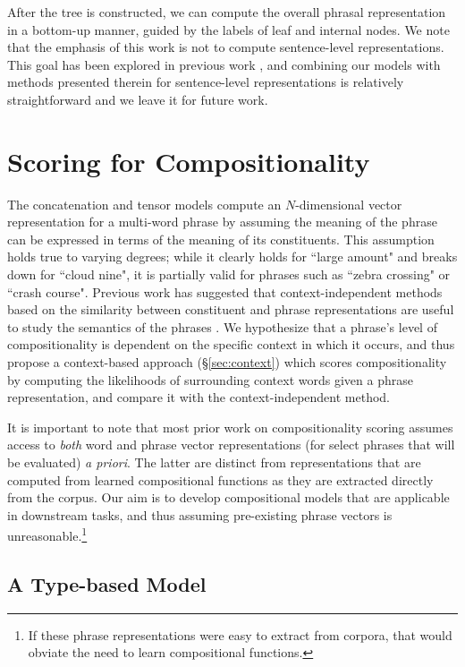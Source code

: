 \documentclass[11pt,letterpaper]{article}
\begin{document}
After the tree is constructed, we can compute the overall phrasal representation in a bottom-up manner, guided by the labels of leaf and internal nodes.
We note that the emphasis of this work is not to compute sentence-level representations. 
This goal has been explored in previous work \cite{Le2014,Kalchbrenner2014}, and combining our models with methods presented therein for sentence-level representations is relatively straightforward and we leave it for future work. 

\section{Scoring for Compositionality}
\label{sec:scoring}

The concatenation and tensor models compute an $N$-dimensional vector representation for a multi-word phrase by assuming the meaning of the phrase can be expressed in terms of the meaning of its constituents. 
This assumption holds true to varying degrees; while it clearly holds for ``large amount" and breaks down for ``cloud nine", it is partially valid for phrases such as ``zebra crossing" or ``crash course". 
Previous work has suggested that context-independent methods based on the similarity between constituent and phrase representations are useful to study the semantics of the phrases \cite{McCarthy2003,Bannard2003,Reddy2011}. 
We hypothesize that a phrase's level of compositionality is dependent on the specific context in which it occurs, and thus propose a context-based approach (\S\ref{sec:context}) which scores compositionality by computing the likelihoods of surrounding context words given a phrase representation, and compare it with the context-independent method. 

It is important to note that most prior work on compositionality scoring assumes access to \emph{both} word and phrase vector representations (for select phrases that will be evaluated) \emph{a priori}.  
The latter are distinct from representations that are computed from learned compositional functions as they are extracted directly from the corpus. 
Our aim is to develop compositional models that are applicable in downstream tasks, and thus assuming pre-existing phrase vectors is unreasonable.\footnote{If these phrase representations were easy to extract from corpora, that would obviate the need to learn compositional functions.}

\subsection{A Type-based Model}
\label{sec:independent}
\end{document}

